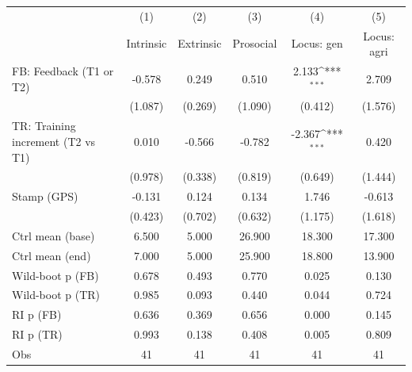 {
\def\sym#1{\ifmmode^{#1}\else\(^{#1}\)\fi}
\begin{tabular}{l*{5}{c}}
\toprule
                    &\multicolumn{1}{c}{(1)}&\multicolumn{1}{c}{(2)}&\multicolumn{1}{c}{(3)}&\multicolumn{1}{c}{(4)}&\multicolumn{1}{c}{(5)}\\
                    &\multicolumn{1}{c}{Intrinsic}&\multicolumn{1}{c}{Extrinsic}&\multicolumn{1}{c}{Prosocial}&\multicolumn{1}{c}{Locus: gen}&\multicolumn{1}{c}{Locus: agri}\\
\midrule
FB: Feedback (T1 or T2)&      -0.578         &       0.249         &       0.510         &       2.133\sym{***}&       2.709         \\
                    &     (1.087)         &     (0.269)         &     (1.090)         &     (0.412)         &     (1.576)         \\
TR: Training increment (T2 vs T1)&       0.010         &      -0.566         &      -0.782         &      -2.367\sym{***}&       0.420         \\
                    &     (0.978)         &     (0.338)         &     (0.819)         &     (0.649)         &     (1.444)         \\
Stamp (GPS)         &      -0.131         &       0.124         &       0.134         &       1.746         &      -0.613         \\
                    &     (0.423)         &     (0.702)         &     (0.632)         &     (1.175)         &     (1.618)         \\
\midrule
Ctrl mean (base)    &       6.500         &       5.000         &      26.900         &      18.300         &      17.300         \\
Ctrl mean (end)     &       7.000         &       5.000         &      25.900         &      18.800         &      13.900         \\
Wild-boot p (FB)    &       0.678         &       0.493         &       0.770         &       0.025         &       0.130         \\
Wild-boot p (TR)    &       0.985         &       0.093         &       0.440         &       0.044         &       0.724         \\
RI p (FB)           &       0.636         &       0.369         &       0.656         &       0.000         &       0.145         \\
RI p (TR)           &       0.993         &       0.138         &       0.408         &       0.005         &       0.809         \\
Obs                 &          41         &          41         &          41         &          41         &          41         \\
\bottomrule
\end{tabular}
}
